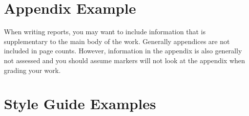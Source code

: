 \begin{appendices}
\section{Appendix Example}
When writing reports, you may want to include information that is supplementary to the main body of the work. Generally appendices are not included in page counts. However, information in the appendix is also generally not assessed and you should assume markers will not look at the appendix when grading your work.
% 
\section{Style Guide Examples}\label{app:StyleGuide}

\end{appendices}
% 
